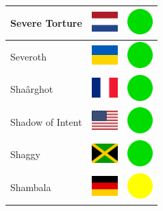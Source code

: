 \documentclass[12pt, a4paper, twoside]{report}
\begin{document}
\begin{center}
\begin{longtable}{|p{5cm}|p{2cm}|p{2cm}|}
 Severe Torture                                             & \includegraphics[width=1cm]{../4x3/nl} &   \includegraphics[width=1cm]{../likes/y} \\ \hline
 Severoth                                                   & \includegraphics[width=1cm]{../4x3/ua} &   \includegraphics[width=1cm]{../likes/y} \\ \hline
 Shaârghot                                                  & \includegraphics[width=1cm]{../4x3/fr} &   \includegraphics[width=1cm]{../likes/y} \\ \hline
 Shadow of Intent                                           & \includegraphics[width=1cm]{../4x3/us} &   \includegraphics[width=1cm]{../likes/y} \\ \hline
 Shaggy                                                     & \includegraphics[width=1cm]{../4x3/jm} &   \includegraphics[width=1cm]{../likes/y} \\ \hline
 Shambala                                                   & \includegraphics[width=1cm]{../4x3/de} &   \includegraphics[width=1cm]{../likes/m} \\ \hline

\end{longtable}
\end{center}
\end{document}
